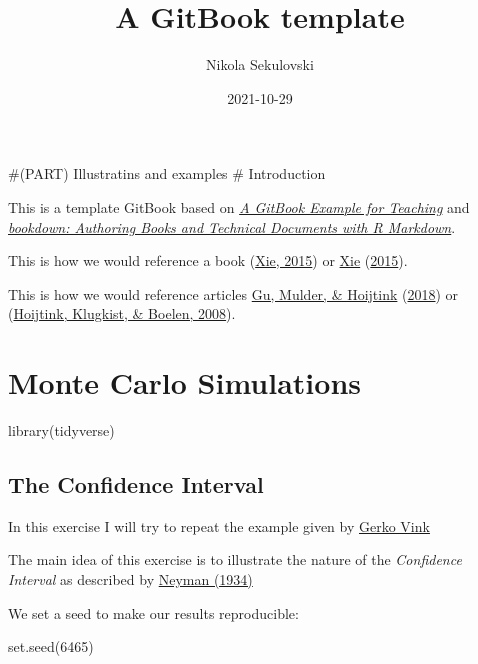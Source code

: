 \documentclass[
]{book}
\title{A GitBook template}
\author{Nikola Sekulovski}
\date{2021-10-29}
\newenvironment{Shaded}{\begin{snugshade}}{\end{snugshade}}
\newcommand{\DecValTok}[1]{\textcolor[rgb]{0.00,0.00,0.81}{#1}}
\newcommand{\FunctionTok}[1]{\textcolor[rgb]{0.00,0.00,0.00}{#1}}
\newcommand{\NormalTok}[1]{#1}
\begin{document}
\maketitle

{
\setcounter{tocdepth}{1}
\tableofcontents
}
\#(PART) Illustratins and examples
\# Introduction

This is a template GitBook based on \href{https://cjvanlissa.github.io/gitbook-demo/}{\emph{A GitBook Example for Teaching}} and \href{https://bookdown.org/yihui/bookdown/}{\emph{bookdown: Authoring Books and Technical Documents with R Markdown}}.

This is how we would reference a book (\protect\hyperlink{ref-xie2015}{Xie, 2015}) or \protect\hyperlink{ref-xie2015}{Xie} (\protect\hyperlink{ref-xie2015}{2015}).

This is how we would reference articles \protect\hyperlink{ref-gu2018approximated}{Gu, Mulder, \& Hoijtink} (\protect\hyperlink{ref-gu2018approximated}{2018}) or (\protect\hyperlink{ref-hoijtink2008bayesian}{Hoijtink, Klugkist, \& Boelen, 2008}).

\hypertarget{monte-carlo-simulations}{%
\chapter{Monte Carlo Simulations}\label{monte-carlo-simulations}}

\begin{Shaded}
\begin{Highlighting}[]
\FunctionTok{library}\NormalTok{(tidyverse)}
\end{Highlighting}
\end{Shaded}

\hypertarget{the-confidence-interval}{%
\section{The Confidence Interval}\label{the-confidence-interval}}

In this exercise I will try to repeat the example given by \href{https://www.gerkovink.com/markup/Wk1/Solution_to_Ex1.html}{Gerko Vink}

The main idea of this exercise is to illustrate the nature of the \emph{Confidence Interval} as described by \href{http://www.stat.cmu.edu/~brian/905-2008/papers/neyman-1934-jrss.pdf}{Neyman (1934)}

We set a seed to make our results reproducible:

\begin{Shaded}
\begin{Highlighting}[]
\FunctionTok{set.seed}\NormalTok{(}\DecValTok{6465}\NormalTok{)}
\end{Highlighting}
\end{Shaded}
\end{document}
